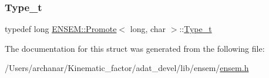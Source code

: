 \subsubsection{\texorpdfstring{Type\_t}{Type\_t}\hspace{0.1cm}{\footnotesize\ttfamily [2/2]}}
{\footnotesize\ttfamily typedef long \mbox{\hyperlink{structENSEM_1_1Promote}{E\+N\+S\+E\+M\+::\+Promote}}$<$ long, char $>$\+::\mbox{\hyperlink{structENSEM_1_1Promote_3_01long_00_01char_01_4_a375f85fa724594195cd72e89a7f3a20c}{Type\+\_\+t}}}



The documentation for this struct was generated from the following file\+:\begin{DoxyCompactItemize}
\item 
/\+Users/archanar/\+Kinematic\+\_\+factor/adat\+\_\+devel/lib/ensem/\mbox{\hyperlink{lib_2ensem_2ensem_8h}{ensem.\+h}}\end{DoxyCompactItemize}
